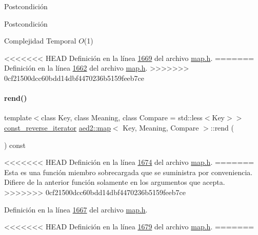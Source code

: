 \begin{DoxyPostcond}{\-Postcondición}
\begin{DoxyPostcond}{\-Postcondición}
\begin{DoxyDescription}
\item[Complejidad Temporal]$O$(1)
\end{DoxyDescription}

<<<<<<< HEAD
\-Definición en la línea \hyperlink{map_8h_source_l01669}{1669} del archivo \hyperlink{map_8h_source}{map.\-h}.
=======
Definición en la línea \hyperlink{map_8h_source_l01662}{1662} del archivo \hyperlink{map_8h_source}{map.\+h}.
>>>>>>> 0cf21500dcc60bdd14dbf4470236b5159feeb7ce

\mbox{\label{classaed2_1_1map_a7cf14a4b505505d0f074034b7399fb24_a7cf14a4b505505d0f074034b7399fb24}} 
\paragraph{\texorpdfstring{rend()}{rend()}\hspace{0.1cm}{\footnotesize\ttfamily [2/2]}}
{\footnotesize\ttfamily template$<$class Key, class Meaning, class Compare = std\+::less$<$\+Key$>$$>$ \\
\hyperlink{classaed2_1_1map_aed66a216549d13078a3ea6978ea0b768_aed66a216549d13078a3ea6978ea0b768}{const\+\_\+reverse\+\_\+iterator} \hyperlink{classaed2_1_1map}{aed2\+::map}$<$ Key, Meaning, Compare $>$\+::rend (\begin{DoxyParamCaption}{ }\end{DoxyParamCaption}) const\hspace{0.3cm}{\ttfamily [inline]}}

<<<<<<< HEAD
\-Definición en la línea \hyperlink{map_8h_source_l01674}{1674} del archivo \hyperlink{map_8h_source}{map.\-h}.
=======
Esta es una función miembro sobrecargada que se suministra por conveniencia. Difiere de la anterior función solamente en los argumentos que acepta. 
>>>>>>> 0cf21500dcc60bdd14dbf4470236b5159feeb7ce

Definición en la línea \hyperlink{map_8h_source_l01667}{1667} del archivo \hyperlink{map_8h_source}{map.\+h}.

<<<<<<< HEAD
\-Definición en la línea \hyperlink{map_8h_source_l01679}{1679} del archivo \hyperlink{map_8h_source}{map.\-h}.
=======
\mbox{\label{classaed2_1_1map_a40933b2efe1cb479de9195ea947244d1_a40933b2efe1cb479de9195ea947244d1}} 

\end{DoxyPostcond}
\end{DoxyPostcond}
